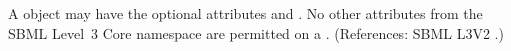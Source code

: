 A \KineticLaw object may have the optional attributes   and
.  No other attributes from the SBML Level~3 Core namespace
are permitted on a \KineticLaw.  (References: SBML L3V2
.)
